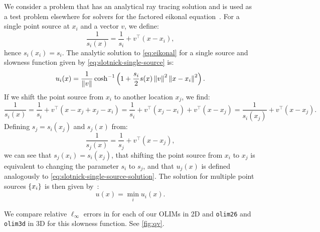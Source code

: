 \documentclass[sisc-eikonal.tex]{subfiles}
\begin{document}
We consider a problem that has an analytical ray tracing solution and
is used as a test problem elsewhere for solvers for the factored
eikonal
equation~\cite{slotnick1959lessons,fomel2009fast,qi2018corner}. For a
single point source at $x_i$ and a vector $v$, we define:
\begin{equation}
  \label{eq:slotnick-single-source}
  \frac{1}{s_i(x)} = \frac{1}{s_i} + v^\top {(x - x_i)},
\end{equation}
hence $s_i(x_i) = s_i$. The analytic solution to \cref{eq:eikonal} for a
single source and slowness function given by
\cref{eq:slotnick-single-source} is:
\begin{equation}
  \label{eq:slotnick-single-source-solution}
  u_i(x) = \frac{1}{\norm{v}} \cosh^{-1} \parens{1 + \frac{s_i}{2} s(x) \norm{v}^2 \norm{x - x_i}^2}.
\end{equation}
If we shift the point source from $x_i$ to another location $x_j$, we
find:
\begin{equation}
  \label{eq:slotnick-slowness-shift}
  \frac{1}{s_i(x)} = \frac{1}{s_i} + v^\top {(x - x_j + x_j - x_i)} = \frac{1}{s_i} + v^\top {(x_j - x_i)} + v^\top {(x - x_j)} = \frac{1}{s_i(x_j)} + v^\top {(x - x_j)}.
\end{equation}
Defining $s_j = s_i(x_j)$ and $s_j(x)$ from:
\begin{equation}
  \frac{1}{s_j(x)} = \frac{1}{s_j} + v^\top {(x - x_j)},
\end{equation}
we can see that $s_j(x_i) = s_i(x_j)$, that shifting the point source
from $x_i$ to $x_j$ is equivalent to changing the parameter $s_i$ to
$s_j$, and that $u_j(x)$ is defined analogously to
\cref{eq:slotnick-single-source-solution}. The solution for multiple
point sources $\left\{x_i\right\}$ is then given
by~\cite{fomel2009fast,qi2018corner}:
\begin{equation}
  u(x) = \min_i u_i(x).
\end{equation}

We compare relative $\ell_\infty$ errors in for each of our OLIMs in
2D and \texttt{olim26} and \texttt{olim3d} in 3D for this slowness
function. See \cref{fig:qv}.
\end{document}
